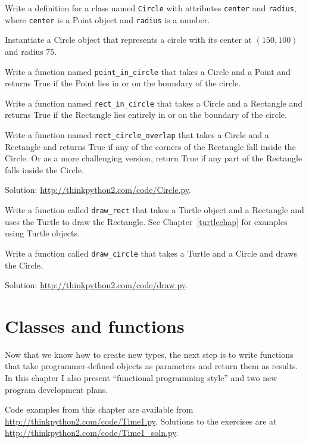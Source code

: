 \documentclass[10pt]{book}
\begin{document}
\begin{exercise}

Write a definition for a class named {\tt Circle} with attributes
{\tt center} and {\tt radius}, where {\tt center} is a Point object
and {\tt radius} is a number.

Instantiate a Circle object that represents a circle with its center
at $(150, 100)$ and radius 75.

Write a function named \verb"point_in_circle" that takes a Circle and
a Point and returns True if the Point lies in or on the boundary of
the circle.

Write a function named \verb"rect_in_circle" that takes a Circle and a
Rectangle and returns True if the Rectangle lies entirely in or on the boundary
of the circle.

Write a function named \verb"rect_circle_overlap" that takes a Circle
and a Rectangle and returns True if any of the corners of the Rectangle fall
inside the Circle.  Or as a more challenging version, return True if
any part of the Rectangle falls inside the Circle.

Solution: \url{http://thinkpython2.com/code/Circle.py}.

\end{exercise}


\begin{exercise}

Write a function called \verb"draw_rect" that takes a Turtle object
and a Rectangle and uses the Turtle to draw the Rectangle.  See
Chapter~\ref{turtlechap} for examples using Turtle objects.

Write a function called \verb"draw_circle" that takes a Turtle and
a Circle and draws the Circle.

Solution: \url{http://thinkpython2.com/code/draw.py}.

\end{exercise}



\chapter{Classes and functions}
\label{time}

Now that we know how to create new types, the next
step is to write functions that take programmer-defined objects
as parameters and return them as results.  In this chapter I
also present ``functional programming style'' and two new
program development plans.

Code examples from this chapter are available from
\url{http://thinkpython2.com/code/Time1.py}.
Solutions to the exercises are at
\url{http://thinkpython2.com/code/Time1_soln.py}.
\end{document}

